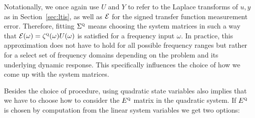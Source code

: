 Notationally, we once again use $U$ and $Y$ to refer to the Laplace transforms of $u, y$ as in Section~\ref{sec:ltis}, as well as $\mathcal{E}$ for the signed transfer function measurement error.
Therefore, fitting $\Sigma^{\textnormal{\scshape q}}$ means choosing the system matrices in such a way that $\mathcal{E}(\omega) = \zeta^{\textnormal{\scshape q}}(\omega) U(\omega)$ is satisfied for a frequency input $\omega$.
In practice, this approximation does not have to hold for all possible frequency ranges but rather for a select set of frequency domains depending on the problem and its underlying dynamic response.
This specifically influences the choice of how we come up with the system matrices.

Besides the choice of procedure, using quadratic state variables also implies that we have to choose how to consider the $E^{\textnormal{\scshape q}}$ matrix in the quadratic system.
If $E^{\textnormal{\scshape q}}$ is chosen by computation from the linear system variables we get two options:


